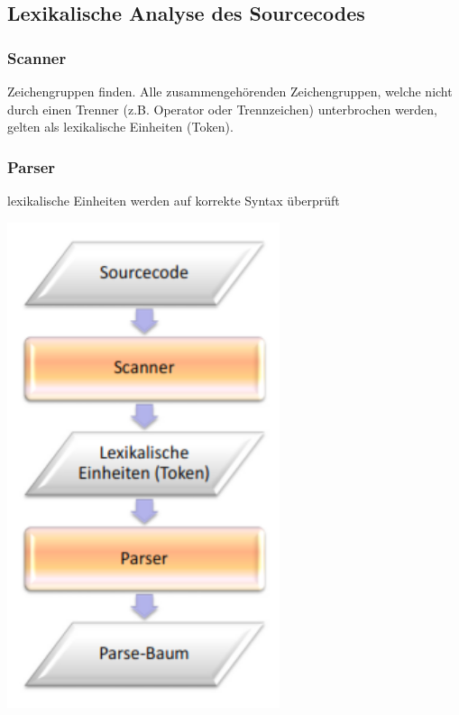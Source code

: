  	\subsection{Lexikalische Analyse des Sourcecodes}
 		\begin{minipage}[c]{5 cm}
 			\subsubsection{Scanner}
 				Zeichengruppen finden. Alle zusammengehörenden
 				Zeichengruppen, welche nicht durch einen Trenner 
 				(z.B. Operator oder Trennzeichen) unterbrochen werden, gelten als lexikalische Einheiten (Token).
 			\vspace*{0.5cm}
 		 	\subsubsection{Parser}
 		 		lexikalische Einheiten werden auf korrekte Syntax überprüft
 		\end{minipage}
 		\hspace*{1.5cm}
 		\begin{minipage}[c]{5 cm}
 			\includegraphics[width=0.6\textwidth]{pics/Lexikalische_Analyse.png}
 		\end{minipage}
